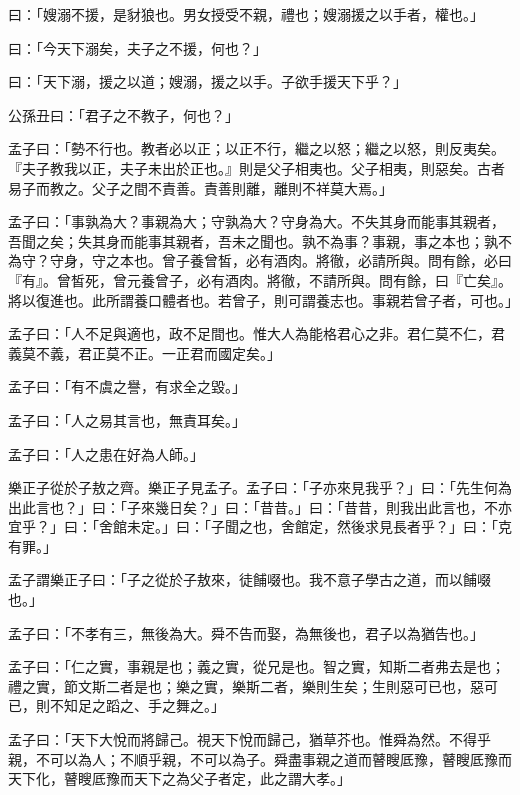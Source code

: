 \begin{pinyinscope}
曰：「嫂溺不援，是豺狼也。男女授受不親，禮也；嫂溺援之以手者，權也。」

曰：「今天下溺矣，夫子之不援，何也？」

曰：「天下溺，援之以道；嫂溺，援之以手。子欲手援天下乎？」

公孫丑曰：「君子之不教子，何也？」

孟子曰：「勢不行也。教者必以正；以正不行，繼之以怒；繼之以怒，則反夷矣。『夫子教我以正，夫子未出於正也。』則是父子相夷也。父子相夷，則惡矣。古者易子而教之。父子之間不責善。責善則離，離則不祥莫大焉。」

孟子曰：「事孰為大？事親為大；守孰為大？守身為大。不失其身而能事其親者，吾聞之矣；失其身而能事其親者，吾未之聞也。孰不為事？事親，事之本也；孰不為守？守身，守之本也。曾子養曾皙，必有酒肉。將徹，必請所與。問有餘，必曰『有』。曾皙死，曾元養曾子，必有酒肉。將徹，不請所與。問有餘，曰『亡矣』。將以復進也。此所謂養口體者也。若曾子，則可謂養志也。事親若曾子者，可也。」

孟子曰：「人不足與適也，政不足間也。惟大人為能格君心之非。君仁莫不仁，君義莫不義，君正莫不正。一正君而國定矣。」

孟子曰：「有不虞之譽，有求全之毀。」

孟子曰：「人之易其言也，無責耳矣。」

孟子曰：「人之患在好為人師。」

樂正子從於子敖之齊。樂正子見孟子。孟子曰：「子亦來見我乎？」曰：「先生何為出此言也？」曰：「子來幾日矣？」曰：「昔昔。」曰：「昔昔，則我出此言也，不亦宜乎？」曰：「舍館未定。」曰：「子聞之也，舍館定，然後求見長者乎？」曰：「克有罪。」

孟子謂樂正子曰：「子之從於子敖來，徒餔啜也。我不意子學古之道，而以餔啜也。」

孟子曰：「不孝有三，無後為大。舜不告而娶，為無後也，君子以為猶告也。」

孟子曰：「仁之實，事親是也；義之實，從兄是也。智之實，知斯二者弗去是也；禮之實，節文斯二者是也；樂之實，樂斯二者，樂則生矣；生則惡可已也，惡可已，則不知足之蹈之、手之舞之。」

孟子曰：「天下大悅而將歸己。視天下悅而歸己，猶草芥也。惟舜為然。不得乎親，不可以為人；不順乎親，不可以為子。舜盡事親之道而瞽瞍厎豫，瞽瞍厎豫而天下化，瞽瞍厎豫而天下之為父子者定，此之謂大孝。」


\end{pinyinscope}